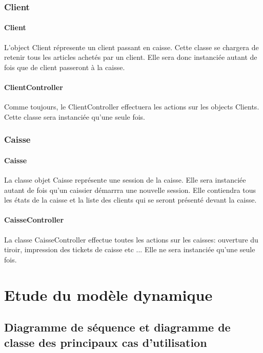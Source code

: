 \subsection{Client}
\subsubsection{Client}
L'object Client répresente un client passant en caisse. Cette classe se chargera de retenir tous les articles achetés par un client. Elle sera donc instanciée autant de fois que de client passeront à la caisse.

\subsubsection{ClientController}
Comme toujours, le ClientController effectuera les actions sur les objects Clients. Cette classe sera instanciée qu'une seule fois.

\subsection{Caisse}

\subsubsection{Caisse}
La classe objet Caisse représente une session de la caisse. Elle sera instanciée autant de fois qu'un caissier démarrra une nouvelle session. Elle contiendra tous les états de la caisse et la liste des clients qui se seront présenté devant la caisse.

\subsubsection{CaisseController}
La classe CaisseController effectue toutes les actions sur les caisses: ouverture du tiroir, impression des tickets de caisse etc ...
Elle ne sera instanciée qu'une seule fois.


\chapter{Etude du modèle dynamique}

\section{Diagramme de séquence et diagramme de classe des principaux cas d'utilisation}

